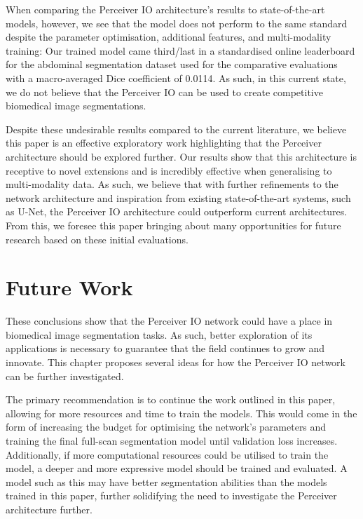 \documentclass{l4proj}
\begin{document}
When comparing the Perceiver IO architecture’s results to state-of-the-art models, however, we see that the model does not perform to the same standard despite the parameter optimisation, additional features, and multi-modality training: Our trained model came third/last in a standardised online leaderboard for the abdominal segmentation dataset used for the comparative evaluations with a macro-averaged Dice coefficient of \num{0.0114}. As such, in this current state, we do not believe that the Perceiver IO can be used to create competitive biomedical image segmentations.

Despite these undesirable results compared to the current literature, we believe this paper is an effective exploratory work highlighting that the Perceiver architecture should be explored further. Our results show that this architecture is receptive to novel extensions and is incredibly effective when generalising to multi-modality data. As such, we believe that with further refinements to the network architecture and inspiration from existing state-of-the-art systems, such as U-Net, the Perceiver IO architecture could outperform current architectures. From this, we foresee this paper bringing about many opportunities for future research based on these initial evaluations.


\section{Future Work} \label{sec:future_work}

These conclusions show that the Perceiver IO network could have a place in biomedical image segmentation tasks. As such, better exploration of its applications is necessary to guarantee that the field continues to grow and innovate. This chapter proposes several ideas for how the Perceiver IO network can be further investigated.

The primary recommendation is to continue the work outlined in this paper, allowing for more resources and time to train the models. This would come in the form of increasing the budget for optimising the network’s parameters and training the final full-scan segmentation model until validation loss increases. Additionally, if more computational resources could be utilised to train the model, a deeper and more expressive model should be trained and evaluated. A model such as this may have better segmentation abilities than the models trained in this paper, further solidifying the need to investigate the Perceiver architecture further.
\end{document}
